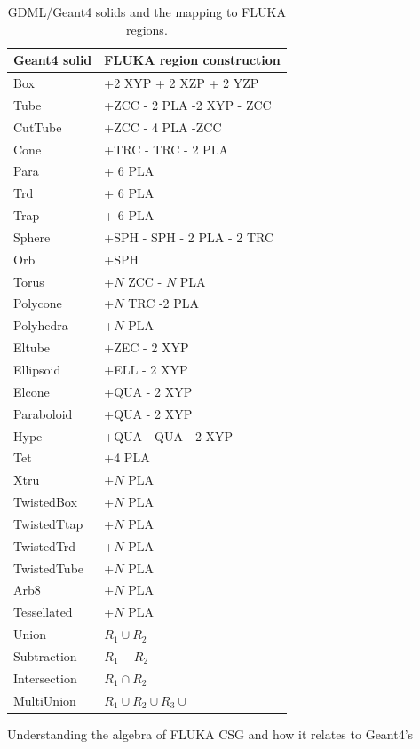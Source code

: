 \documentclass[final,5p,times,twocolumn]{elsarticle}
\begin{document}
\begin{table}[hbt!]
\centering
\begin{tabular}{ l  l  } \hline
Geant4 solid			& FLUKA region construction		\\ \hline
Box					& +2 XYP + 2 XZP + 2 YZP 		\\
Tube					& +ZCC - 2 PLA -2 XYP - ZCC	 	\\
CutTube				& +ZCC - 4 PLA -ZCC			\\
Cone				& +TRC - TRC - 2 PLA 			\\
Para					& + 6 PLA						\\
Trd					& + 6 PLA						\\
Trap					& + 6 PLA						\\
Sphere				& +SPH - SPH  - 2 PLA - 2 TRC	\\
Orb					& +SPH						\\
Torus				& +$N$ ZCC  - $N$ PLA			\\
Polycone				& +$N$ TRC -2 PLA				\\
Polyhedra				& +$N$ PLA					\\
Eltube				& +ZEC  - 2 XYP				\\
Ellipsoid				& +ELL - 2 XYP		 			\\
Elcone				& +QUA - 2 XYP				\\
Paraboloid			& +QUA - 2 XYP				\\
Hype					& +QUA - QUA - 2 XYP			\\
Tet					& +4 PLA						\\
Xtru					& +$N$ PLA \\
TwistedBox			& +$N$ PLA					\\
TwistedTtap			& +$N$ PLA					\\
TwistedTrd			& +$N$ PLA				 	\\
TwistedTube			& +$N$ PLA					\\
Arb8					& +$N$ PLA					\\
Tessellated			& +$N$ PLA				 	\\
Union				& $R_1 \cup R_2$				\\
Subtraction			& $R_1 - R_2$					\\
Intersection			& $R_1 \cap R_2$				\\
MultiUnion			& $R_1 \cup R_2 \cup R_3 \cup$	\\ \hline
\end{tabular}
\label{tab:geant2fluka}
\caption{GDML/Geant4 solids and the mapping to FLUKA regions.}
\end{table}
Understanding the algebra of FLUKA CSG and how it relates to Geant4's
\end{document}
